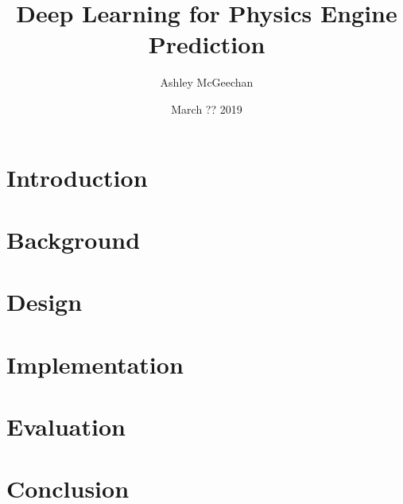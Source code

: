 \documentclass{l4proj}
\begin{document}
\title{Deep Learning for Physics Engine Prediction}
\author{Ashley McGeechan}
\date{March ?? 2019}
\maketitle

\begin{abstract}
    
\end{abstract}

\tableofcontents

\chapter{Introduction}

\chapter{Background}

\chapter{Design}

\chapter{Implementation}

\chapter{Evaluation}

\chapter{Conclusion}
\end{document}
